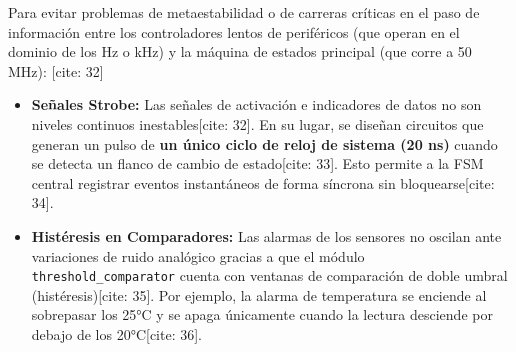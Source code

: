 Para evitar problemas de metaestabilidad o de carreras críticas en el paso de información entre los controladores lentos de periféricos (que operan en el dominio de los Hz o kHz) y la máquina de estados principal (que corre a 50 MHz): [cite: 32]
\begin{itemize}
	\item \textbf{Señales Strobe:} Las señales de activación e indicadores de datos no son niveles continuos inestables[cite: 32]. En su lugar, se diseñan circuitos que generan un pulso de \textbf{un único ciclo de reloj de sistema (20 ns)} cuando se detecta un flanco de cambio de estado[cite: 33]. Esto permite a la FSM central registrar eventos instantáneos de forma síncrona sin bloquearse[cite: 34].
	\item \textbf{Histéresis en Comparadores:} Las alarmas de los sensores no oscilan ante variaciones de ruido analógico gracias a que el módulo \texttt{threshold\_comparator} cuenta con ventanas de comparación de doble umbral (histéresis)[cite: 35]. Por ejemplo, la alarma de temperatura se enciende al sobrepasar los 25°C y se apaga únicamente cuando la lectura desciende por debajo de los 20°C[cite: 36].
\end{itemize}
